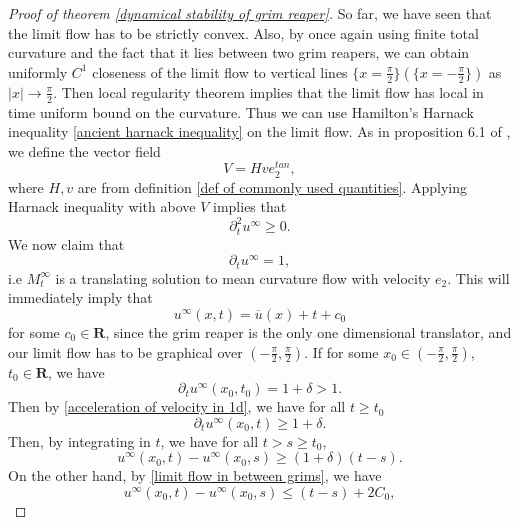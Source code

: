 \documentclass[pdflatex,sn-mathphys-num]{sn-jnl}%
\begin{document}
\begin{proof}[Proof of theorem \ref{dynamical stability of grim reaper}]
So far, we have seen that the limit flow has to be strictly convex. Also, by once again using finite total curvature and the fact that it lies between two grim reapers, we can obtain uniformly $C^1$ closeness of the limit flow to vertical lines $\{ x = \frac{\pi}{2}\} (\{x = -\frac{\pi}{2}\})$ as $|x| \to \frac{\pi}{2}$. Then local regularity theorem \cite{White2005-nl} implies that the limit flow has local in time uniform bound on the curvature. Thus we can use Hamilton's Harnack inequality \eqref{ancient harnack inequality} on the limit flow. As in proposition 6.1 of \cite{brendlechoi}, we define the vector field
\begin{equation}
    V = Hve_2^{tan},
\end{equation}
where $H, v$ are from definition \ref{def of commonly used quantities}. Applying Harnack inequality with above $V$ implies that
\begin{equation}\label{acceleration of velocity in 1d}
    \partial_t^2u^{\infty} \geq 0.
\end{equation}
We now claim that \begin{equation}
    \partial_tu^{\infty} = 1,
\end{equation}
i.e $M^{\infty}_t$ is a translating solution to mean curvature flow with velocity $e_2$. This will immediately imply that \begin{equation}
    u^{\infty}(x,t) = \overline{u}(x) + t + c_0
\end{equation}
for some $c_0 \in \mathbf{R}$, since the grim reaper is the only one dimensional translator, and our limit flow has to be graphical over $(-\frac{\pi}{2}, \frac{\pi}{2})$. If for some $x_0 \in (-\frac{\pi}{2}, \frac{\pi}{2})$, $t_0 \in \mathbf{R}$, we have
\begin{equation}
    \partial_tu^{\infty}(x_0, t_0) = 1 + \delta > 1.
\end{equation}
Then by \eqref{acceleration of velocity in 1d}, we have for all $t \geq t_0$
\begin{equation}
    \partial_tu^{\infty}(x_0, t) \geq 1 + \delta.
\end{equation}
Then, by integrating in $t$, we have for all $t > s \geq t_0$,
\begin{equation}
    u^{\infty}(x_0, t) - u^{\infty}(x_0, s) \geq (1 + \delta)(t - s).
\end{equation}
On the other hand, by \eqref{limit flow in between grims}, we have
\begin{equation}
    u^{\infty}(x_0, t) - u^{\infty}(x_0, s) \leq (t - s) +2C_0, 

\end{equation}
\end{proof}
\end{document}
